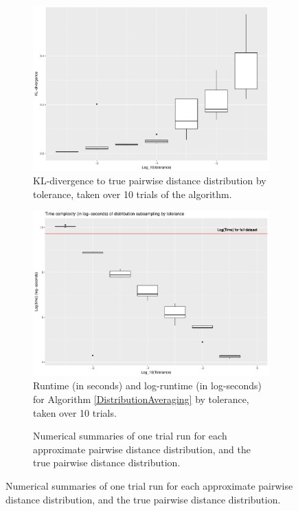 \documentclass{article}
\begin{document}
\begin{figure}
\begin{subfigure}{.5\textwidth}
        \includegraphics[width=\linewidth]{Figures/NearestNeighbor/Sequence/div_by_tol.pdf}
    	\caption{KL-divergence to true pairwise distance distribution by tolerance, taken over 10 trials of the algorithm.}
    	\label{fig:NNDivergencesSequence}
	\end{subfigure}
    \begin{subfigure}{.5\textwidth}
    	\includegraphics[width=0.9\linewidth]{Figures/NearestNeighbor/Sequence/log_time_by_tol.pdf}
    	\caption{Runtime (in seconds) and log-runtime (in log-seconds) for Algorithm \ref{DistributionAveraging} by tolerance, taken over 10 trials.}
    	\label{fig:NNTimesSequence}
    \end{subfigure}
    \begin{subfigure}[H]{\textwidth}
    	\vspace{1em}
		
		\caption{Numerical summaries of one trial run for each approximate pairwise distance distribution, and the true pairwise distance distribution.}
		\label{tab:NNSequenceSummaryTable}
    \end{subfigure}
\end{figure}
\end{document}
